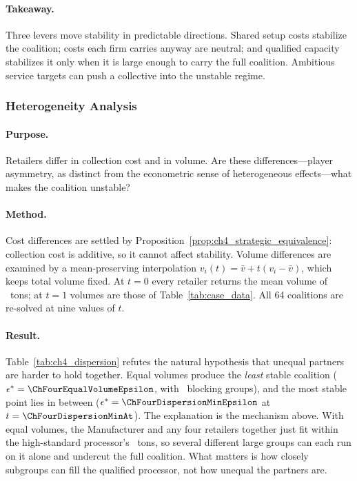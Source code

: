 \paragraph{Takeaway.} Three levers move stability in predictable directions. Shared setup costs stabilize the coalition; costs each firm carries anyway are neutral; and qualified capacity stabilizes it only when it is large enough to carry the full coalition. Ambitious service targets can push a collective into the unstable regime.

\subsubsection{Heterogeneity Analysis}

\paragraph{Purpose.} Retailers differ in collection cost and in volume. Are these differences---player asymmetry, as distinct from the econometric sense of heterogeneous effects---what makes the coalition unstable?

\paragraph{Method.} Cost differences are settled by Proposition~\ref{prop:ch4_strategic_equivalence}: collection cost is additive, so it cannot affect stability. Volume differences are examined by a mean-preserving interpolation $v_i(t)=\bar v+t(v_i-\bar v)$, which keeps total volume fixed. At $t=0$ every retailer returns the mean volume of \ChFourEqualVolumeEach\ tons; at $t=1$ volumes are those of Table~\ref{tab:case_data}. All 64 coalitions are re-solved at nine values of $t$.

\paragraph{Result.} Table~\ref{tab:ch4_dispersion} refutes the natural hypothesis that unequal partners are harder to hold together. Equal volumes produce the \emph{least} stable coalition ($\epsilon^*=\ChFourEqualVolumeEpsilon$, with \ChFourEqualVolumeBlocking\ blocking groups), and the most stable point lies in between ($\epsilon^*=\ChFourDispersionMinEpsilon$ at $t=\ChFourDispersionMinAt$). The explanation is the mechanism above. With equal volumes, the Manufacturer and any four retailers together just fit within the high-standard processor's \ChFourPlatformCapacity\ tons, so several different large groups can each run on it alone and undercut the full coalition. What matters is how closely subgroups can fill the qualified processor, not how unequal the partners are.

